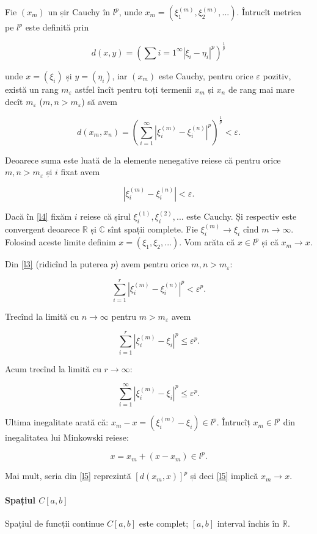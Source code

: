 \documentclass[a4paper,12pt]{article}
\theoremstyle{change}
\newenvironment{proof}[1][Proof]{\begin{trivlist}
\item[\hskip \labelsep {\bfseries #1}]}{\end{trivlist}}
\begin{document}
\begin{proof}
Fie $(x_m)$ un șir Cauchy în $l^p$, unde $x_m=(\xi_1^{(m)},\xi_2^{(m)},...)$. Întrucît metrica pe $l^p$ este definită prin

\[
  d(x,y) = \left(\sum{i=1}^\infty |\xi_i - \eta_i|^p\right)^{\frac{1}{p}}
\]

\noindent unde $x=(\xi_i)$ și $y=(\eta_i)$, iar $(x_m)$ este Cauchy, pentru orice $\varepsilon$ pozitiv, există un rang $m_{\varepsilon}$ astfel încît pentru toți termenii $x_m$ și $x_n$ de rang mai mare decît $m_{\varepsilon}$ ($m,n>m_{\varepsilon}$) să avem

\[
\label{l3}
d(x_m,x_n) = \left(\sum_{i=1}^\infty |\xi_i^{(m)} - \xi_i^{(n)}|^p\right)^{\frac{1}{p}} < \varepsilon.
\]

Deoarece suma este luată de la elemente nenegative reiese că pentru orice $m,n>m_\varepsilon$ și $i$ fixat avem

\[
\label{l4}
|\xi_i^{(m)} - \xi_i^{(n)}| < \varepsilon.
\]

Dacă în \eqref{l4} fixăm $i$ reiese că șirul $\xi_i^{(1)},\xi_i^{(2)},...$ este Cauchy. Și respectiv este convergent deoarece $\mathbb{R}$ și $\mathbb{C}$ sînt spații complete. Fie $\xi_i^{(m)}\to \xi_i$ cînd $m\to\infty$. Folosind aceste limite definim $x=(\xi_1, \xi_2,...)$. Vom arăta că $x\in l^p$ și că $x_m\to x$.

Din \eqref{l3} (ridicînd la puterea $p$) avem pentru orice $m,n>m_\varepsilon$:

\[
\sum_{i=1}^r |\xi_i^{(m)} - \xi_i^{(n)}|^p < \varepsilon^p.
\]

Trecînd la limită cu $n\to\infty$ pentru $m>m_\varepsilon$ avem

\[
\sum_{i=1}^r |\xi_i^{(m)} - \xi_i|^p \leq \varepsilon^p.
\]

Acum trecînd la limită cu $r\to\infty$:

\[
\label{l5}
\sum_{i=1}^\infty |\xi_i^{(m)} - \xi_i|^p \leq \varepsilon^p.
\]

Ultima inegalitate arată că: $x_m-x=(\xi_i^{(m)}-\xi_i)\in l^p$. Întrucîț $x_m\in l^p$ din inegalitatea lui Minkowski reiese:

\[
x=x_m+(x-x_m)\in l^p.
\]

Mai mult, seria din \eqref{l5} reprezintă $[d(x_m,x)]^p$ și deci \eqref{l5} implică $x_m\to x$.

\end{proof}

\paragraph{Spațiul $C[a,b]$} Spațiul de funcții continue $C[a,b]$ este complet; $[a,b]$ interval închis în $\mathbb{R}$.
\end{document}
